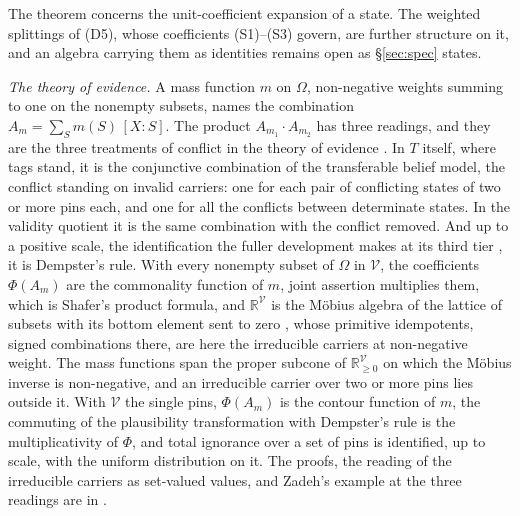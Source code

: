 \noindent The theorem concerns the unit-coefficient expansion of a state. The weighted splittings of (D5), whose coefficients (S1)--(S3) govern, are further structure on it, and an algebra carrying them as identities remains open as \S\ref{sec:spec} states.

\textit{The theory of evidence.} A mass function $m$ on $\Omega$, non-negative weights summing to one on the nonempty subsets, names the combination $A_m = \sum_S m(S)\,[X : S]$. The product $A_{m_1} \cdot A_{m_2}$ has three readings, and they are the three treatments of conflict in the theory of evidence \cite{dempster1967, shafer1976, smets1994}. In $T$ itself, where tags stand, it is the conjunctive combination of the transferable belief model, the conflict standing on invalid carriers: one for each pair of conflicting states of two or more pins each, and one for all the conflicts between determinate states. In the validity quotient it is the same combination with the conflict removed. And up to a positive scale, the identification the fuller development makes at its third tier \cite{Aethus}, it is Dempster's rule. With every nonempty subset of $\Omega$ in $\mathcal{V}$, the coefficients $\Phi(A_m)$ are the commonality function of $m$, joint assertion multiplies them, which is Shafer's product formula, and $\mathbb{R}^{\mathcal{V}}$ is the M\"obius algebra of the lattice of subsets with its bottom element sent to zero \cite{solomon1967, greene1973}, whose primitive idempotents, signed combinations there, are here the irreducible carriers at non-negative weight. The mass functions span the proper subcone of $\mathbb{R}_{\geq 0}^{\mathcal{V}}$ on which the M\"obius inverse is non-negative, and an irreducible carrier over two or more pins lies outside it. With $\mathcal{V}$ the single pins, $\Phi(A_m)$ is the contour function of $m$, the commuting of the plausibility transformation with Dempster's rule \cite{voorbraak1989, cobb2006} is the multiplicativity of $\Phi$, and total ignorance over a set of pins is identified, up to scale, with the uniform distribution on it. The proofs, the reading of the irreducible carriers as set-valued values, and Zadeh's example at the three readings are in \cite{AethusEvidence}.

